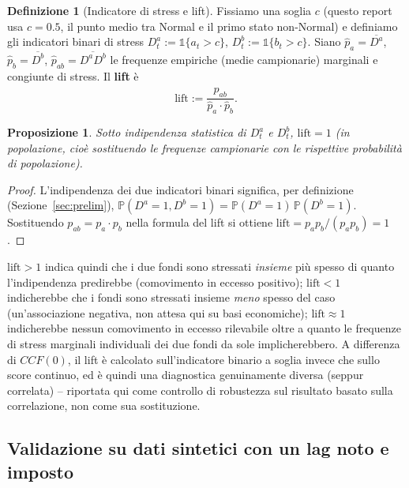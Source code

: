 \documentclass[11pt]{article}
\newtheorem{proposition}[theorem]{Proposizione}
\theoremstyle{definition}
\newtheorem{definition}[theorem]{Definizione}
\theoremstyle{remark}
\begin{document}
\begin{definition}[Indicatore di stress e lift]
Fissiamo una soglia $c$ (questo report usa $c=0.5$, il punto medio tra Normal e il primo stato non-Normal) e definiamo gli indicatori binari di stress $D_t^{a}:=\mathbb{1}\{a_t>c\}$, $D_t^{b}:=\mathbb{1}\{b_t>c\}$. Siano $\widehat p_a=\overline{D^a}$, $\widehat p_b=\overline{D^b}$, $\widehat p_{ab}=\overline{D^aD^b}$ le frequenze empiriche (medie campionarie) marginali e congiunte di stress. Il \textbf{lift} \`e
\[
\mathrm{lift} := \frac{\widehat p_{ab}}{\widehat p_a\cdot\widehat p_b}.
\]
\end{definition}
\begin{proposition}
Sotto indipendenza statistica di $D^a_t$ e $D^b_t$, $\mathrm{lift}=1$ (in popolazione, cio\`e sostituendo le frequenze campionarie con le rispettive probabilit\`a di popolazione).
\end{proposition}
\begin{proof}
L'indipendenza dei due indicatori binari significa, per definizione (Sezione~\ref{sec:prelim}), $\mathbb{P}(D^a=1,D^b=1)=\mathbb{P}(D^a=1)\,\mathbb{P}(D^b=1)$. Sostituendo $p_{ab}=p_a\cdot p_b$ nella formula del lift si ottiene $\mathrm{lift}=p_a p_b/(p_a p_b)=1$.
\end{proof}
$\mathrm{lift}>1$ indica quindi che i due fondi sono stressati \emph{insieme} pi\`u spesso di quanto l'indipendenza predirebbe (comovimento in eccesso positivo); $\mathrm{lift}<1$ indicherebbe che i fondi sono stressati insieme \emph{meno} spesso del caso (un'associazione negativa, non attesa qui su basi economiche); $\mathrm{lift}\approx1$ indicherebbe nessun comovimento in eccesso rilevabile oltre a quanto le frequenze di stress marginali individuali dei due fondi da sole implicherebbero. A differenza di $CCF(0)$, il lift \`e calcolato sull'indicatore binario a soglia invece che sullo score continuo, ed \`e quindi una diagnostica genuinamente diversa (seppur correlata) -- riportata qui come controllo di robustezza sul risultato basato sulla correlazione, non come sua sostituzione.

\subsection{Validazione su dati sintetici con un lag noto e imposto}
\label{sec:crossetf-demo}
\end{document}
